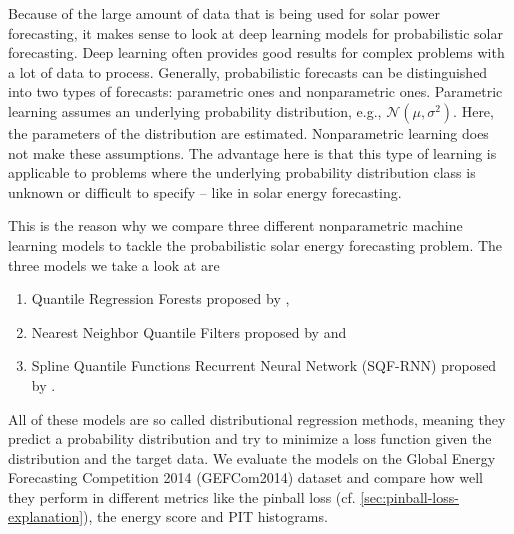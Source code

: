 Because of the large amount of data that is being used for solar power forecasting, it makes sense to look at 
deep learning models for probabilistic solar forecasting. 
Deep learning often provides good results for complex problems with a lot of data to process. 
Generally, probabilistic forecasts can be distinguished into two types of forecasts: parametric ones and nonparametric ones. 
Parametric learning assumes an underlying probability distribution, e.g., \(\mathcal{N}(\mu, \sigma^2)\). Here, the parameters 
of the distribution are estimated. 
Nonparametric learning does not make these assumptions. 
The advantage here is that this type of learning is applicable to problems where the underlying 
probability distribution class is unknown or difficult to specify -- like in solar energy forecasting. 


This is the reason why we compare three different nonparametric machine learning models 
to tackle the probabilistic solar energy forecasting problem. 
The three models we take a look at are 
\begin{enumerate}
    \item Quantile Regression Forests proposed by \Textcite{Meinshausen2006},
    \item Nearest Neighbor Quantile Filters proposed by \Textcite{Ordiano2019} and
    \item Spline Quantile Functions Recurrent Neural Network (SQF-RNN) proposed by \Textcite{Gasthaus2019}.
\end{enumerate}
All of these models are so called distributional regression methods, meaning 
they predict a probability distribution and try to minimize a loss function 
given the distribution and the target data.
We evaluate the models on the Global Energy Forecasting Competition 2014 (GEFCom2014) dataset and compare how well they perform 
in different metrics like the pinball loss (cf. \ref{sec:pinball-loss-explanation}), the energy score and PIT histograms. 